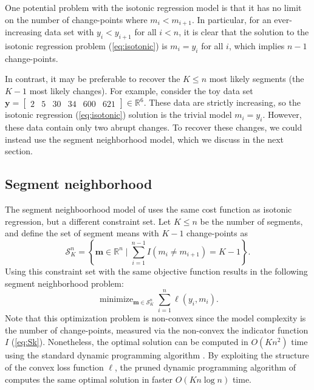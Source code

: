 \documentclass{article}
\DeclareMathOperator*{\minimize}{minimize}
\newcommand{\RR}{\mathbb R}
\begin{document}
One potential problem with the isotonic regression model is that it
has no limit on the number of change-points where $m_i < m_{i+1}$. In
particular, for an ever-increasing data set with $y_i < y_{i+1}$ for
all $i<n$, it is clear that the solution to the isotonic regression
problem (\ref{eq:isotonic}) is $m_i=y_i$ for all $i$, which implies
$n-1$ change-points. 

In contrast, it may be preferable to recover the $K\leq n$ most likely
segments (the $K-1$ most likely changes). For example, consider the
toy data set $\mathbf y= \left[
\begin{array}{cccccc}
  2 & 5 & 30 & 34 & 600 & 621
\end{array}
\right] \in\RR^6$. These data are strictly increasing, so the isotonic
regression (\ref{eq:isotonic}) solution is the trivial model
$m_i=y_i$. However, these data contain only two abrupt changes. To
recover these changes, we could instead use the segment
neighborhood model, which we discuss in the next section.

\subsection{Segment neighborhood}

The segment neighboorhood model of \citet{segment-neighborhood} uses
the same cost function as isotonic regression, but a different
constraint set. Let $K\leq n$ be the number of segments, and define
the set of segment means with $K-1$ change-points as
\begin{equation}
  \label{eq:Sk}
  \mathcal S_K^n = \left\{
  \mathbf m\in\RR^n
  \mid
  \sum_{i=1}^{n-1} I(m_i \neq m_{i+1}) = K-1
  \right\}.
\end{equation}
Using this constraint set with the same objective function results in
the following segment neighborhood problem:
\begin{equation}
  \label{eq:optimal_segment_neighborhood}
  \minimize_{\mathbf m\in\mathcal S_K^n} \sum_{i=1}^n \ell(y_i, m_i).
\end{equation}
Note that this optimization problem is non-convex since the model
complexity is the number of change-points, measured via the non-convex
the indicator function $I$ (\ref{eq:Sk}). Nonetheless, the optimal
solution can be computed in $O(K n^2)$ time using the standard dynamic
programming algorithm \citep{segment-neighborhood}. By exploiting the
structure of the convex loss function $\ell$, the pruned dynamic
programming algorithm of \citet{pruned-dp} computes the same optimal
solution in faster $O(K n \log n)$ time.
\end{document}
